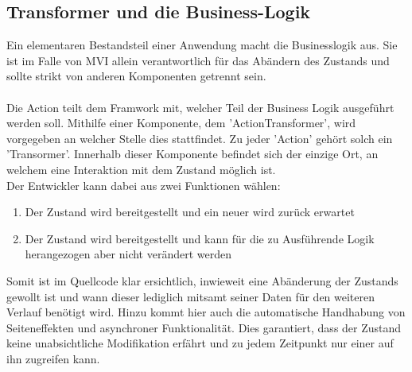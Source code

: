 \subsection{Transformer und die Business-Logik}
Ein elementaren Bestandsteil einer Anwendung macht die Businesslogik aus. Sie ist im Falle von MVI allein verantwortlich für das Abändern des Zustands und sollte strikt von anderen Komponenten getrennt sein.
\\\\
Die Action teilt dem Framwork mit, welcher Teil der Business Logik ausgeführt werden soll. Mithilfe einer Komponente, dem 'ActionTransformer', wird vorgegeben an welcher Stelle dies stattfindet. Zu jeder 'Action' gehört solch ein 'Transormer'. Innerhalb dieser Komponente befindet sich der einzige Ort, an welchem eine Interaktion mit dem Zustand möglich ist.
\\
Der Entwickler kann dabei aus zwei Funktionen wählen:
\begin{enumerate}
	\item Der Zustand wird bereitgestellt und ein neuer wird zurück erwartet
	\item Der Zustand wird bereitgestellt und kann für die zu Ausführende Logik herangezogen aber nicht verändert werden 
\end{enumerate}
\bigskip
Somit ist im Quellcode klar ersichtlich, inwieweit eine Abänderung der Zustands gewollt ist und wann dieser lediglich mitsamt seiner Daten für den weiteren Verlauf benötigt wird. Hinzu kommt hier auch die automatische Handhabung von Seiteneffekten und asynchroner Funktionalität. Dies garantiert, dass der Zustand keine unabsichtliche Modifikation erfährt und zu jedem Zeitpunkt nur einer auf ihn zugreifen kann.

